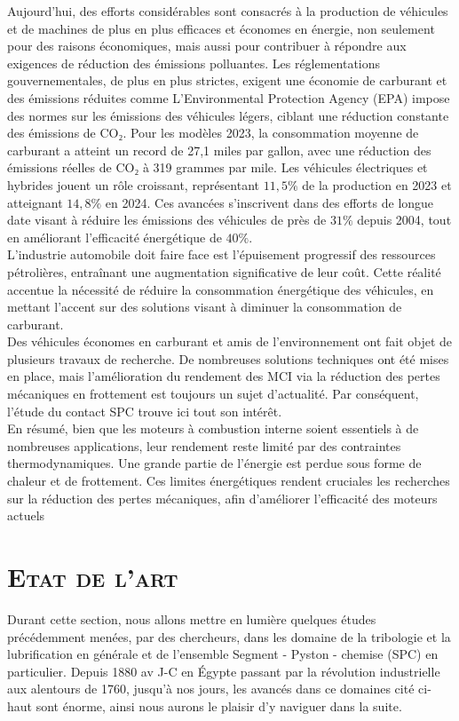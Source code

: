 Aujourd'hui, des efforts considérables sont consacrés à la production de véhicules et de machines de plus en plus efficaces et économes en énergie, non seulement pour des raisons économiques, mais aussi pour contribuer à répondre aux exigences de réduction des émissions polluantes. Les réglementations gouvernementales, de plus en plus strictes, exigent une économie de carburant et des émissions réduites comme L'Environmental Protection Agency (EPA) impose des normes sur les émissions des véhicules légers, ciblant une réduction constante des émissions de CO₂. Pour les modèles 2023, la consommation moyenne de carburant a atteint un record de 27,1 miles par gallon, avec une réduction des émissions réelles de CO₂ à 319 grammes par mile. Les véhicules électriques et hybrides jouent un rôle croissant, représentant $11,5\%$ de la production en 2023 et atteignant $14,8\%$ en 2024. Ces avancées s'inscrivent dans des efforts de longue date visant à réduire les émissions des véhicules de près de $31\%$ depuis 2004, tout en améliorant l'efficacité énergétique de $40\%.$ \cite{epa}\\

L'industrie automobile doit faire face est l'épuisement progressif des ressources pétrolières, entraînant une augmentation significative de leur coût. Cette réalité accentue la nécessité de réduire la consommation énergétique des véhicules, en mettant l'accent sur des solutions visant à diminuer la consommation de carburant.\\

Des véhicules économes en carburant et amis de l'environnement ont fait objet de plusieurs travaux de recherche. De nombreuses solutions techniques ont été mises en place, mais l'amélioration du rendement des MCI via la réduction des pertes mécaniques en frottement est toujours un sujet d'actualité.\cite{Amal} Par conséquent, l’étude du contact SPC trouve ici tout son intérêt.\\


En résumé, bien que les moteurs à combustion interne soient essentiels à de nombreuses applications, leur rendement reste limité par des contraintes thermodynamiques. Une grande partie de l'énergie est perdue sous forme de chaleur et de frottement. Ces limites énergétiques rendent cruciales les recherches sur la réduction des pertes mécaniques, afin d'améliorer l’efficacité des moteurs actuels

\section{\textsc{Etat de l'art}}\label{etat_art}
Durant cette section, nous allons mettre en lumière quelques études précédemment menées, par des chercheurs, dans les domaine de la tribologie et la lubrification en générale et de l'ensemble Segment - Pyston - chemise (SPC) en particulier. Depuis 1880 av J-C en Égypte passant par la révolution industrielle aux alentours de 1760, jusqu'à nos jours, les avancés dans ce domaines cité ci-haut sont énorme, ainsi nous aurons le plaisir d'y naviguer dans la suite.
